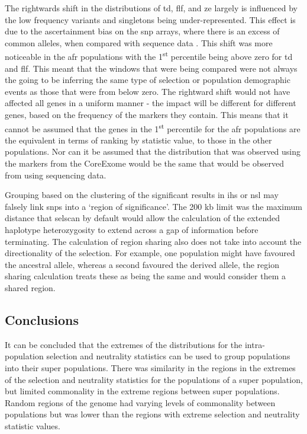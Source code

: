 \documentclass[]{report}
\begin{document}
The rightwards shift in the distributions of \gls{td}, \gls{flf}, and
\gls{ze} largely is influenced by the low frequency variants and
singletons being under-represented. This effect is due to the
ascertainment bias on the \gls{snp} arrays, where there is an excess of
common alleles, when compared with sequence data
\citep{Ramirez-Soriano2009}. This shift was more noticeable in the
\gls{afr} populations with the 1\textsuperscript{st} percentile being
above zero for \gls{td} and \gls{flf}. This meant that the windows that
were being compared were not always the going to be inferring the same
type of selection or population demographic events as those that were
from below zero. The rightward shift would not have affected all genes
in a uniform manner - the impact will be different for different genes,
based on the frequency of the markers they contain. This means that it
cannot be assumed that the genes in the 1\textsuperscript{st} percentile
for the \gls{afr} populations are the equivalent in terms of ranking by
statistic value, to those in the other populations. Nor can it be
assumed that the distribution that was observed using the markers from
the CoreExome would be the same that would be observed from using
sequencing data.

Grouping based on the clustering of the significant results in \gls{ihs}
or \gls{nsl} may falsely link \glspl{snp} into a `region of
significance'. The 200 kb limit was the maximum distance that selscan by
default would allow the calculation of the extended haplotype
heterozygosity to extend across a gap of information before terminating.
The calculation of region sharing also does not take into account the
directionality of the selection. For example, one population might have
favoured the ancestral allele, whereas a second favoured the derived
allele, the region sharing calculation treats these as being the same
and would consider them a shared region.

\subsection{Conclusions}\label{conclusions}

It can be concluded that the extremes of the distributions for the
intra-population selection and neutrality statistics can be used to
group populations into their super populations. There was similarity in
the regions in the extremes of the selection and neutrality statistics
for the populations of a super population, but limited commonality in
the extreme regions between super populations. Random regions of the
genome had varying levels of commonality between populations but was
lower than the regions with extreme selection and neutrality statistic
values.
\end{document}
